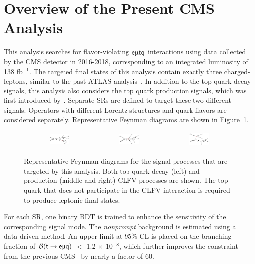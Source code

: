 \section{Overview of the Present CMS Analysis}
\label{sec:CLFV_This}

This analysis searches for flavor-violating $\textsf{e}\upmu\textsf{t{q}}$ interactions using data collected by the \ac{CMS} detector in 2016-2018, corresponding to an integrated luminosity of 138 fb$^{-1}$. The targeted final states of this analysis contain exactly three charged-leptons, similar to the past ATLAS analysis~\cite{ATLAS-CONF-2018-044}. In addition to the top quark decay signals, this analysis also considers the top quark production signals, which was first introduced by~\cite{CMS:2022ztx}. Separate \acp{SR} are defined to target these two different signals. Operators with different Lorentz structures and quark flavors are considered separately. Representative Feynman diagrams are shown in Figure~\ref{fig:CMS_FD_This}. 
 
\begin{figure}[tbh!]
 \begin{center}
 \begin{tabular}{ccc}
 \includegraphics[width=0.31\textwidth]{figures/Part3/History/TT}&
 \includegraphics[width=0.33\textwidth]{figures/Part3/History/ST1}&
 \includegraphics[width=0.31\textwidth]{figures/Part3/History/ST2}\\
 \end{tabular}
 \caption{Representative Feynman diagrams for the signal processes that are targeted by this analysis. Both top quark decay (left) and production (middle and right) \ac{CLFV} processes are shown. The top quark that does not participate in the \ac{CLFV} interaction is required to produce leptonic final states.}
 \label{fig:CMS_FD_This}
 \end{center}
 \end{figure}
 
For each \ac{SR}, one binary \ac{BDT} is trained to enhance the sensitivity of the corresponding signal mode. The \emph{nonprompt} background is estimated using a data-driven method. An upper limit at 95\% \ac{CL} is placed on the branching fraction of $\mathcal{B}(\textsf{t}\rightarrow\textsf{e}\upmu\textsf{q})$ $<$ 1.2 $\times$ 10$^{-8}$, which further improves the constraint from the previous \ac{CMS}~\cite{CMS:2022ztx} by nearly a factor of 60.